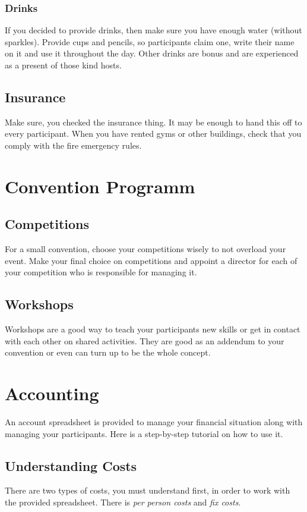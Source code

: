 \documentclass[11pt]{report}
\begin{document}
\subsection{Drinks}
If you decided to provide drinks, then make sure you have enough water 
(without sparkles). Provide cups and pencils, so participants claim one, write 
their name on it and use it throughout the day. Other drinks are bonus and are 
experienced as a present of those kind hosts.

\section{Insurance}

Make sure, you checked the insurance thing. It may be enough to hand this off to 
every participant. When you have rented gyms or other buildings, check that 
you comply with the fire emergency rules. 

\chapter{Convention Programm}

\section{Competitions}
For a small convention, choose your competitions wisely to not overload your 
event. Make your final choice on competitions and appoint a director for each of 
your competition who is responsible for managing it.

\section{Workshops}
Workshops are a good way to teach your participants new skills or get in contact 
with each other on shared activities. They are good as an addendum to your 
convention or even can turn up to be the whole concept.

\chapter{Accounting}
\label{sec:Accounting}

An account spreadsheet is provided to manage your financial situation along with 
managing your participants. Here is a step-by-step tutorial on how to use it.

\section{Understanding Costs}
There are two types of costs, you must understand first, in order to work with 
the provided spreadsheet. There is \textit{per person costs} and
\textit{fix costs}.
\end{document}
